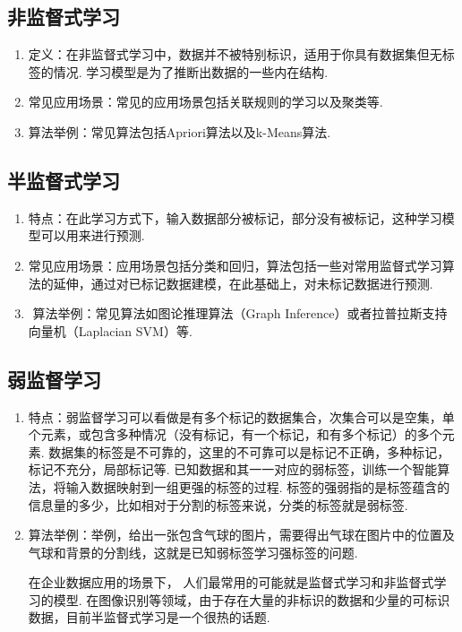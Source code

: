 \subsection{非监督式学习}
\label{ux975eux76d1ux7763ux5f0fux5b66ux4e60}
\begin{enumerate}
\item 定义：在非监督式学习中，数据并不被特别标识，适用于你具有数据集但无标签的情况.
  学习模型是为了推断出数据的一些内在结构.
\item 常见应用场景：常见的应用场景包括关联规则的学习以及聚类等.
\item ​算法举例：常见算法包括Apriori算法以及k-Means算法.
\end{enumerate}

\subsection{半监督式学习}
\label{ux534aux76d1ux7763ux5f0fux5b66ux4e60}
\begin{enumerate}
\item 特点：在此学习方式下，输入数据部分被标记，部分没有被标记，这种学习模型可以用来进行预测.
\item 常见应用场景：应用场景包括分类和回归，算法包括一些对常用监督式学习算法的延伸，通过对已标记数据建模，在此基础上，对未标记数据进行预测.
\item ​ 算法举例：常见算法如图论推理算法（Graph Inference）或者拉普拉斯支持向量机（Laplacian SVM）等.
\end{enumerate}
\subsection{弱监督学习}
\label{ux5f31ux76d1ux7763ux5b66ux4e60}
\begin{enumerate}
\item 特点：弱监督学习可以看做是有多个标记的数据集合，次集合可以是空集，单个元素，或包含多种情况（没有标记，有一个标记，和有多个标记）的多个元素.
  数据集的标签是不可靠的，这里的不可靠可以是标记不正确，多种标记，标记不充分，局部标记等.
已知数据和其一一对应的弱标签，训练一个智能算法，将输入数据映射到一组更强的标签的过程.
标签的强弱指的是标签蕴含的信息量的多少，比如相对于分割的标签来说，分类的标签就是弱标签.
\item 算法举例：举例，给出一张包含气球的图片，需要得出气球在图片中的位置及气球和背景的分割线，这就是已知弱标签学习强标签的问题.

​在企业数据应用的场景下，
人们最常用的可能就是监督式学习和非监督式学习的模型.
在图像识别等领域，由于存在大量的非标识的数据和少量的可标识数据，目前半监督式学习是一个很热的话题.
\end{enumerate}
